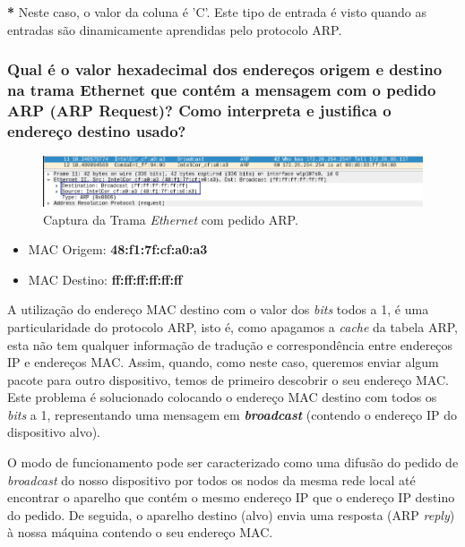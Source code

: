     \par \textbf{*} Neste caso, o valor da coluna é 'C'. Este tipo de entrada é visto quando as entradas são dinamicamente aprendidas pelo protocolo ARP.


    
    





\subsubsection{Qual é o valor hexadecimal dos endereços origem e destino na trama Ethernet que contém a mensagem com o pedido ARP (ARP Request)? Como interpreta e justifica o endereço destino usado?}

    \begin{figure}[H]
    \centering
    \includegraphics[width=500pt]{prints/Questao4/questao4-firstARP.png}
    \caption{Captura da Trama \textit{Ethernet} com pedido ARP.} \label{questao4-ARPRequest2}
    \end{figure}
    
    \begin{multicols}{2}
    \begin{itemize}
        \item MAC Origem: \textbf{48:f1:7f:cf:a0:a3}  
        \item MAC Destino: \textbf{ff:ff:ff:ff:ff:ff}
    \end{itemize}
    \end{multicols}


    \par A utilização do endereço MAC destino com o valor dos \textit{bits} todos a 1, é uma particularidade do protocolo ARP, isto é, como apagamos a \textit{cache} da tabela ARP, esta não tem qualquer informação de tradução e correspondência entre endereços IP e endereços MAC. Assim, quando, como neste caso, queremos enviar algum pacote para outro dispositivo, temos de primeiro descobrir o seu endereço MAC. Este problema é solucionado colocando o endereço MAC destino com todos os \textit{bits} a 1, representando uma mensagem em \textbf{\textit{broadcast}} (contendo o endereço IP do dispositivo alvo). 
    \par O modo de funcionamento pode ser caracterizado como uma difusão do pedido de \textit{broadcast} do nosso dispositivo por todos os nodos da mesma rede local até encontrar o aparelho que contém o mesmo endereço IP que o endereço IP destino do pedido. De seguida, o aparelho destino (alvo) envia uma resposta (ARP \textit{reply}) à nossa máquina contendo o seu endereço MAC.



